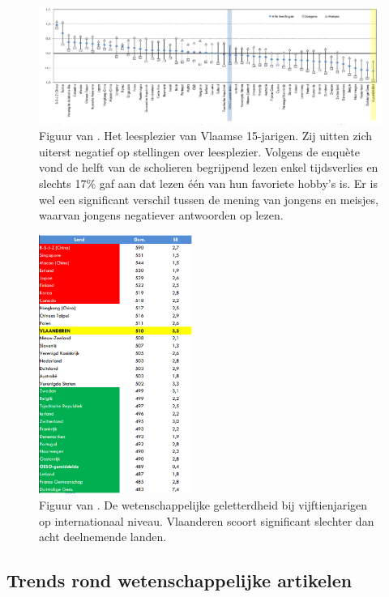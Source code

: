 \begin{figure}[H]
	\begin{center}
		\includegraphics[width=\linewidth]{img/oeso-graphic-leesplezier.png}
	\end{center}
	\caption{Figuur van \textcite{DeMeyer2019}. Het leesplezier van Vlaamse 15-jarigen. Zij uitten zich uiterst negatief op stellingen over leesplezier. Volgens de enquète vond de helft van de scholieren begrijpend lezen enkel tijdsverlies en slechts 17\% gaf aan dat lezen één van hun favoriete hobby's is. Er is wel een significant verschil tussen de mening van jongens en meisjes, waarvan jongens negatiever antwoorden op lezen.}
\end{figure}

\begin{figure}[H]
	\begin{center}
		\includegraphics[width=5cm]{img/oeso-graphic-wetenschappelijke-geletterdheid-2.png}
	\end{center}
	\caption{Figuur van \textcite{DeMeyer2019}. De wetenschappelijke geletterdheid bij vijftienjarigen op internationaal niveau. Vlaanderen scoort significant slechter dan acht deelnemende landen.}
\end{figure}


\subsection{Trends rond wetenschappelijke artikelen}

